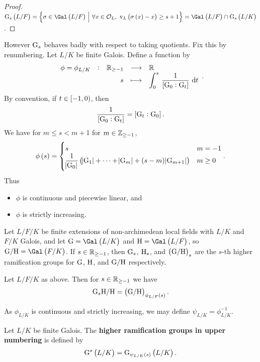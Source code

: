 \begin{proof}
$ \G_s\br{L / F} = \cbr{\sigma \in \Gal\br{L / F} \st \forall x \in \OOO_L, \ \v_L\br{\sigma\br{x} - x} \ge s + 1} = \Gal\br{L / F} \cap \G_s\br{L / K} $.
\end{proof}

However $ \mathrm{G}_s $ behaves badly with respect to taking quotients. Fix this by renumbering. Let $ L / K $ be finite Galois. Define a function by
$$ \function[\phi = \phi_{L / K}]{\RR_{\ge -1}}{\RR}{s}{\displaystyle\intd{0}{s}{\dfrac{1}{\sbr{\G_0 : \G_t}}}{t}}. $$
By convention, if $ t \in \intco{-1, 0} $, then
$$ \dfrac{1}{\sbr{\G_0 : \G_t}} = \sbr{\G_t : \G_0}. $$
We have for $ m \le s < m + 1 $ for $ m \in \mathbb{Z}_{\ge -1} $,
$$ \phi\br{s} =
\begin{cases}
s & m = -1 \\
\dfrac{1}{\abs{\G_0}}\br{\abs{\G_1} + \dots + \abs{\G_m} + \br{s - m}\abs{\G_{m + 1}}} & m \ge 0
\end{cases}.
$$
Thus
\begin{itemize}
\item $ \phi $ is continuous and piecewise linear, and
\item $ \phi $ is strictly increasing.
\end{itemize}

\pagebreak

\begin{notation*}
Let $ L / F / K $ be finite extensions of non-archimedean local fields with $ L / K $ and $ F / K $ Galois, and let $ \G = \Gal\br{L / K} $ and $ \H = \Gal\br{L / F} $, so $ \G / \H = \Gal\br{F / K} $. If $ s \in \mathbb{R}_{\ge -1} $, then $ \mathrm{G}_s $, $ \mathrm{H}_s $, and $ \br{\G / \H}_s $ are the $ s $-th higher ramification groups for $ \mathrm{G} $, $ \mathrm{H} $, and $ \mathrm{G} / \mathrm{H} $ respectively.
\end{notation*}

\begin{theorem}
\label{thm:16.4}
Let $ L / F / K $ as above. Then for $ s \in \mathbb{R}_{\ge -1} $ we have
$$ \G_s\H / \H = \br{\G / \H}_{\phi_{L / F}\br{s}}. $$
\end{theorem}

As $ \phi_{L / K} $ is continuous and strictly increasing, we may define $ \psi_{L / K} = \phi_{L / K}^{-1} $.

\begin{definition}
Let $ L / K $ be finite Galois. The \textbf{higher ramification groups in upper numbering} is defined by
$$ \G^s\br{L / K} = \G_{\psi_{L / K}\br{s}}\br{L / K}. $$
\end{definition}

